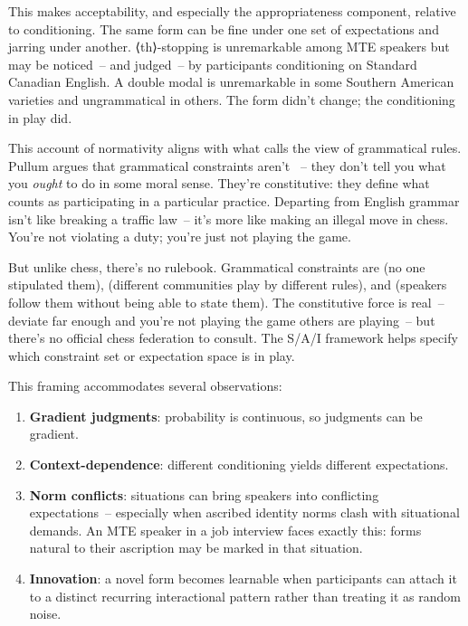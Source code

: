 \documentclass[11pt,letterpaper]{article}
\begin{document}
This makes acceptability, and especially the appropriateness component, relative to conditioning. The same form can be fine under one set of expectations and jarring under another. ⟨th⟩-stopping is unremarkable among MTE speakers but may be noticed~-- and judged~-- by participants conditioning on Standard Canadian English. A double modal is unremarkable in some Southern American varieties and ungrammatical in others. The form didn't change; the conditioning in play did.

This account of normativity aligns with what \textcite{pullum2019-normativity} calls the  view of grammatical rules. Pullum argues that grammatical constraints aren't ~-- they don't tell you what you \emph{ought} to do in some moral sense. They're constitutive: they define what counts as participating in a particular practice. Departing from English grammar isn't like breaking a traffic law~-- it's more like making an illegal move in chess. You're not violating a duty; you're just not playing the game.

But unlike chess, there's no rulebook. Grammatical constraints are  (no one stipulated them),  (different communities play by different rules), and  (speakers follow them without being able to state them). The constitutive force is real~-- deviate far enough and you're not playing the game others are playing~-- but there's no official chess federation to consult. The S/A/I framework helps specify which constraint set or expectation space is in play.

This framing accommodates several observations:

\begin{enumerate}
    \item \textbf{Gradient judgments}: probability is continuous, so judgments can be gradient.
    \item \textbf{Context-dependence}: different conditioning yields different expectations.
    \item \textbf{Norm conflicts}: situations can bring speakers into conflicting expectations~-- especially when ascribed identity norms clash with situational demands. An MTE speaker in a job interview faces exactly this: forms natural to their ascription may be marked in that situation.
    \item \textbf{Innovation}: a novel form becomes learnable when participants can attach it to a distinct recurring interactional pattern rather than treating it as random noise.
\end{enumerate}
\end{document}

